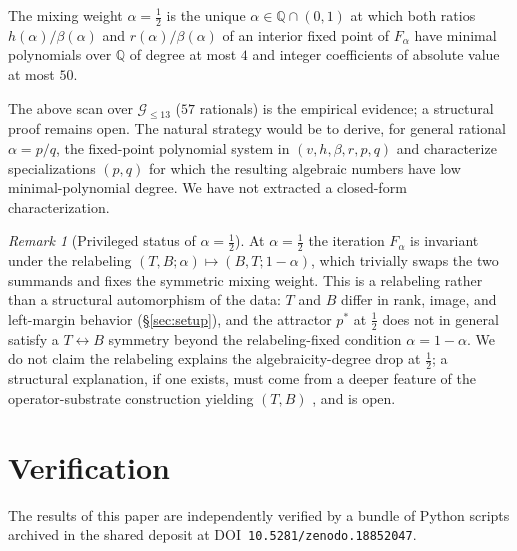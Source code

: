 \documentclass[11pt,reqno]{amsart}
\theoremstyle{plain}
\theoremstyle{definition}
\theoremstyle{remark}
\newtheorem*{remark}{Remark}
\newcommand{\Q}{\mathbb{Q}}
\begin{document}
\begin{conjecture}\label{conj:alpha-unique}
The mixing weight $\alpha = \tfrac12$ is the unique
$\alpha\in\Q\cap(0, 1)$ at which both ratios
$h(\alpha)/\beta(\alpha)$ and $r(\alpha)/\beta(\alpha)$ of an
interior fixed point of $F_{\alpha}$ have minimal polynomials
over $\Q$ of degree at most $4$ and integer coefficients of
absolute value at most $50$.
\end{conjecture}

The above scan over $\mathcal{G}_{\le 13}$ ($57$ rationals) is the
empirical evidence; a structural proof remains open. The natural strategy
would be to derive, for general rational $\alpha = p/q$, the
fixed-point polynomial system in $(v, h, \beta, r, p, q)$ and
characterize specializations $(p, q)$ for which the resulting
algebraic numbers have low minimal-polynomial degree. We have
not extracted a closed-form characterization.

\begin{remark}[Privileged status of $\alpha = \tfrac12$]
At $\alpha = \tfrac12$ the iteration $F_{\alpha}$ is invariant
under the relabeling $(T, B; \alpha)\mapsto (B, T; 1-\alpha)$,
which trivially swaps the two summands and fixes the symmetric
mixing weight. This is a relabeling rather than a structural
automorphism of the data: $T$ and $B$ differ in rank, image,
and left-margin behavior (\S\ref{sec:setup}), and the attractor
$p^*$ at $\tfrac12$ does not in general satisfy a $T \leftrightarrow B$
symmetry beyond the relabeling-fixed condition $\alpha =
1-\alpha$. We do not claim the relabeling explains
the algebraicity-degree drop at $\tfrac12$; a structural
explanation, if one exists, must come from a deeper feature of
the operator-substrate construction yielding $(T, B)$
\cite{SandersGish2026Sigma}, and is open.
\end{remark}

\section{Verification}\label{sec:verify}

The results of this paper are independently verified by a bundle
of Python scripts archived in the shared deposit at
DOI~\texttt{10.5281/zenodo.18852047}.
\end{document}
